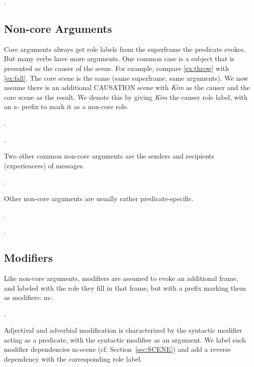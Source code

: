 \documentclass[a4paper]{article}
\newcommand{\fr}[1]{\textsf{#1}}
\newcommand{\rl}[1]{\textsf{#1}}
\begin{document}
\ex.


\newpage\subsection{Non-core Arguments}

Core arguments always get role labels from the superframe the predicate evokes.
But many verbs have more arguments. One common case is a subject that is
presented as the causer of the scene. For example, compare \ref{ex:throw} with
\ref{ex:fall}. The core scene is the same (same superframe, same arguments). We
now assume there is an additional \fr{CAUSATION} scene with \emph{Kim} as the
\rl{causer} and the core scene as the \rl{result}. We denote this by giving
\emph{Kim} the \rl{causer} role label, with an \rl{x-} prefix to mark it as a
non-core role.

\ex.\label{ex:throw}

\ex.

Two other common non-core arguments are the senders and recipients (experiencers) of messages.

\ex.

Other non-core arguments are usually rather predicate-specific.

\ex.

\ex.


\newpage\subsection{Modifiers}
\label{sec:modifiers}

Like non-core arguments, modifiers are assumed to evoke an additional frame,
and labeled with the role they fill in that frame, but with a prefix marking
them as modifiers: \rl{m-}.

\ex.

Adjectival and adverbial modification is characterized by the syntactic
modifier acting as a predicate, with the syntactic modifiee as an argument.  We
label such modifier dependencies \rl{m-scene} (cf. Section~\ref{sec:SCENE}) and
add a reverse dependency with the corresponding role label.
\end{document}
